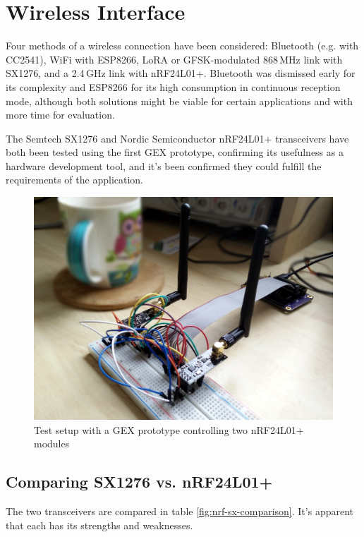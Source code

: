 \chapter{Wireless Interface}

Four methods of a wireless connection have been considered: Bluetooth (e.g. with CC2541), WiFi with ESP8266, LoRA or GFSK-modulated 868\,MHz link with SX1276, and a 2.4\,GHz link with nRF24L01+. Bluetooth was dismissed early for its complexity and ESP8266 for its high consumption in continuous reception mode, although both solutions might be viable for certain applications and with more time for evaluation. 

The Semtech SX1276 and Nordic Semiconductor nRF24L01+ transceivers have both been tested using the first GEX prototype, confirming its usefulness as a hardware development tool, and it's been confirmed they could fulfill the requirements of the application.

\begin{figure}[h]
	\centering
	\includegraphics[width=.7\textwidth]{img/nrf-testing.jpg}
	\caption{Test setup with a GEX prototype controlling two nRF24L01+ modules}
\end{figure}


\section{Comparing SX1276 vs. nRF24L01+}

The two transceivers are compared in table \ref{fig:nrf-sx-comparison}. It's apparent that each has its strengths and weaknesses.

